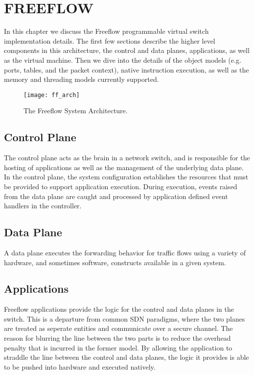 \chapter{FREEFLOW}
\label{ff}
In this chapter we discuss the Freeflow programmable virtual switch
implementation details. The first few sections describe the higher level
components in this architecture, the control and data planes, applications, as
well as the virtual machine. Then we dive into the details of the object
models (e.g. ports, tables, and the packet context), native instruction
execution, as well as the memory and threading models currently supported.

\begin{figure}[h]
\centering
\texttt{[image: ff\_arch]}
\caption{The Freeflow System Architecture.}
\label{ff_arch}
\end{figure}

\section{Control Plane}
\label{ff:cp}
The control plane acts as the brain in a network switch, and is responsible for
the hosting of applications as well as the management of the underlying data
plane. In the control plane, the system configuration establishes the resources
that must be provided to support application execution. During execution,
events raised from the data plane are caught and processed by application
defined event handlers in the controller. 

\section{Data Plane}
\label{ff:dp}
A data plane executes the forwarding behavior for traffic flows using a variety
of hardware, and sometimes software, constructs available in a given system.

\section{Applications}
\label{ff:app}
Freeflow applications provide the logic for the control and data planes in the
switch. This is a departure from common SDN paradigms, where the two planes are
treated as seperate entities and communicate over a secure channel. The reason
for blurring the line between the two parts is to reduce the overhead penalty
that is incurred in the former model. By allowing the application to straddle
the line between the control and data planes, the logic it provides is able
to be pushed into hardware and executed natively.

